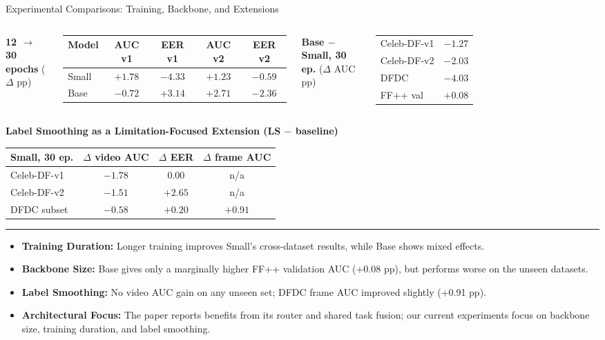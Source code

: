\documentclass[aspectratio=169,10pt]{beamer}
\begin{document}
\begin{frame}{Experimental Comparisons: Training, Backbone, and Extensions}
\scriptsize
\begin{columns}[T,onlytextwidth]
\centering
\textbf{12 $\to$ 30 epochs} ($\Delta$ pp)\\[2pt]
\begin{tabular}{|l||c|c|c|c|}
\hline
Model & AUC v1 & EER v1 & AUC v2 & EER v2\\\hline
Small & $+1.78$ & $-4.33$ & $+1.23$ & $-0.59$\\
Base & $-0.72$ & $+3.14$ & $+2.71$ & $-2.36$\\\hline
\end{tabular}
\centering
\textbf{Base $-$ Small, 30 ep.} ($\Delta$ AUC pp)\\[2pt]
\begin{tabular}{|l||c|}
\hline
Celeb-DF-v1 & $-1.27$\\
Celeb-DF-v2 & $-2.03$\\
DFDC & $-4.03$\\
FF++ val & $+0.08$\\\hline
\end{tabular}
\end{columns}
\vspace{6pt}
\centering
\textbf{Label Smoothing as a Limitation-Focused Extension (LS $-$ baseline)}\\[2pt]
\begin{tabular}{|l||c|c|c|}
\hline
Small, 30 ep. & $\Delta$ video AUC & $\Delta$ EER & $\Delta$ frame AUC\\\hline
Celeb-DF-v1 & $-1.78$ & $0.00$ & n/a\\
Celeb-DF-v2 & $-1.51$ & $+2.65$ & n/a\\
DFDC subset & $-0.58$ & $+0.20$ & $+0.91$\\\hline
\end{tabular}
\vspace{8pt}
\hrule
\vspace{6pt}
\footnotesize
\begin{itemize}
\item \textbf{Training Duration:} Longer training improves Small's cross-dataset results, while Base shows mixed effects.
\item \textbf{Backbone Size:} Base gives only a marginally higher FF++ validation AUC (+0.08 pp), but performs worse on the unseen datasets.
\item \textbf{Label Smoothing:} No video AUC gain on any unseen set; DFDC frame AUC improved slightly (+0.91 pp).
\item \textbf{Architectural Focus:} The paper reports benefits from its router and shared task fusion; our current experiments focus on backbone size, training duration, and label smoothing.
\end{itemize}
\end{frame}
\end{document}

